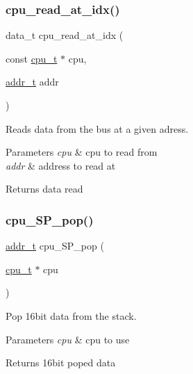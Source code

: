 \subsubsection{\texorpdfstring{cpu\+\_\+read\+\_\+at\+\_\+idx()}{cpu\_read\_at\_idx()}}
{\footnotesize\ttfamily data\+\_\+t cpu\+\_\+read\+\_\+at\+\_\+idx (\begin{DoxyParamCaption}\item[{const \hyperlink{structcpu__t}{cpu\+\_\+t} $\ast$}]{cpu,  }\item[{\hyperlink{memory_8h_a8a6444037e4d5cc2bf8ba22a9d9e33ca}{addr\+\_\+t}}]{addr }\end{DoxyParamCaption})}



Reads data from the bus at a given adress. 


\begin{DoxyParams}{Parameters}
{\em cpu} & cpu to read from \\
\hline
{\em addr} & address to read at\\
\hline
\end{DoxyParams}
\begin{DoxyReturn}{Returns}
data read 
\end{DoxyReturn}
\mbox{\label{cpu-storage_8h_a809e7f4261a0d5f17708404017d50eb4}} 
\subsubsection{\texorpdfstring{cpu\+\_\+\+S\+P\+\_\+pop()}{cpu\_SP\_pop()}}
{\footnotesize\ttfamily \hyperlink{memory_8h_a8a6444037e4d5cc2bf8ba22a9d9e33ca}{addr\+\_\+t} cpu\+\_\+\+S\+P\+\_\+pop (\begin{DoxyParamCaption}\item[{\hyperlink{structcpu__t}{cpu\+\_\+t} $\ast$}]{cpu }\end{DoxyParamCaption})}



Pop 16bit data from the stack. 


\begin{DoxyParams}{Parameters}
{\em cpu} & cpu to use\\
\hline
\end{DoxyParams}
\begin{DoxyReturn}{Returns}
16bit poped data 
\end{DoxyReturn}
\mbox{\label{cpu-storage_8h_aba3b649b19e786e16958bb4d8b478ab3}} 
